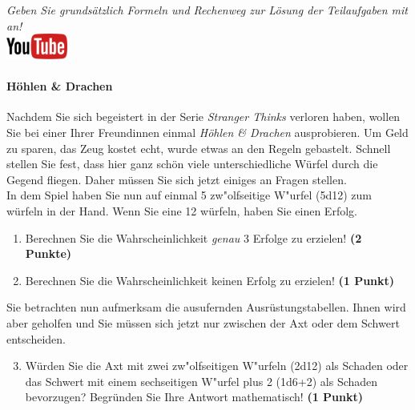 \documentclass[a4paper, 9pt]{scrartcl}\usepackage[]{graphicx}\usepackage[]{xcolor}
\begin{document}
\textit{Geben Sie grunds{\"a}tzlich Formeln und Rechenweg zur L{\"o}sung der
  Teilaufgaben mit an!} \\[1Ex]

\hfill\href{https://youtu.be/8Pb2sKUIMyk}{\includegraphics[width =
  2cm]{img/youtube}} %
\hspace{2Ex}

\paragraph{H{\"o}hlen \& Drachen}



Nachdem Sie sich begeistert in der Serie \textit{Stranger Thinks} verloren
haben, wollen Sie bei einer Ihrer Freundinnen einmal \textit{H{\"o}hlen \& Drachen}
ausprobieren. Um Geld zu sparen, das Zeug kostet echt, wurde etwas an den
Regeln gebastelt. Schnell stellen Sie fest, dass hier ganz sch{\"o}n viele
unterschiedliche W{\"u}rfel durch die Gegend fliegen. Daher m{\"u}ssen Sie sich
jetzt einiges an Fragen stellen. \\%

In dem Spiel haben Sie nun auf einmal 5 zw{"o}lfseitige W{"u}rfel (5d12) zum w{\"u}rfeln in der Hand. Wenn Sie eine 12 w{\"u}rfeln,
haben Sie einen Erfolg.

\begin{enumerate}
\item Berechnen Sie die Wahrscheinlichkeit \textit{genau}
  3 Erfolge zu erzielen!  \textbf{(2 Punkte)}
\item Berechnen Sie die Wahrscheinlichkeit keinen Erfolg zu erzielen!
  \textbf{(1 Punkt)}
\end{enumerate}

Sie betrachten nun aufmerksam die ausufernden Ausr{\"u}stungstabellen. Ihnen
wird aber geholfen und Sie m{\"u}ssen sich jetzt nur zwischen der Axt oder dem
Schwert entscheiden.

\begin{enumerate}
  \setcounter{enumi}{2}
\item W{\"u}rden Sie die Axt mit zwei zw{"o}lfseitigen W{"u}rfeln (2d12) als Schaden oder
  das Schwert mit einem sechseitigen W{"u}rfel plus 2 (1d6+2) als Schaden bevorzugen?
  Begr{\"u}nden Sie Ihre Antwort mathematisch! \textbf{(1 Punkt)}
\end{enumerate}
\end{document}
